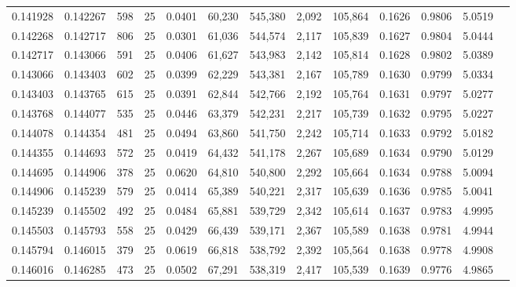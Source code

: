 \begin{tabular}{rrrrrrrrrrrrr}
0.141928 & 0.142267 &   598 &  25 &                                     0.0401 &  60,230 & 545,380 &   2,092 & 105,864 & 0.1626 & 0.9806 & 5.0519 \\
0.142268 & 0.142717 &   806 &  25 &                                     0.0301 &  61,036 & 544,574 &   2,117 & 105,839 & 0.1627 & 0.9804 & 5.0444 \\
0.142717 & 0.143066 &   591 &  25 &                                     0.0406 &  61,627 & 543,983 &   2,142 & 105,814 & 0.1628 & 0.9802 & 5.0389 \\
0.143066 & 0.143403 &   602 &  25 &                                     0.0399 &  62,229 & 543,381 &   2,167 & 105,789 & 0.1630 & 0.9799 & 5.0334 \\
0.143403 & 0.143765 &   615 &  25 &                                     0.0391 &  62,844 & 542,766 &   2,192 & 105,764 & 0.1631 & 0.9797 & 5.0277 \\
0.143768 & 0.144077 &   535 &  25 &                                     0.0446 &  63,379 & 542,231 &   2,217 & 105,739 & 0.1632 & 0.9795 & 5.0227 \\
0.144078 & 0.144354 &   481 &  25 &                                     0.0494 &  63,860 & 541,750 &   2,242 & 105,714 & 0.1633 & 0.9792 & 5.0182 \\
0.144355 & 0.144693 &   572 &  25 &                                     0.0419 &  64,432 & 541,178 &   2,267 & 105,689 & 0.1634 & 0.9790 & 5.0129 \\
0.144695 & 0.144906 &   378 &  25 &                                     0.0620 &  64,810 & 540,800 &   2,292 & 105,664 & 0.1634 & 0.9788 & 5.0094 \\
0.144906 & 0.145239 &   579 &  25 &                                     0.0414 &  65,389 & 540,221 &   2,317 & 105,639 & 0.1636 & 0.9785 & 5.0041 \\
0.145239 & 0.145502 &   492 &  25 &                                     0.0484 &  65,881 & 539,729 &   2,342 & 105,614 & 0.1637 & 0.9783 & 4.9995 \\
0.145503 & 0.145793 &   558 &  25 &                                     0.0429 &  66,439 & 539,171 &   2,367 & 105,589 & 0.1638 & 0.9781 & 4.9944 \\
0.145794 & 0.146015 &   379 &  25 &                                     0.0619 &  66,818 & 538,792 &   2,392 & 105,564 & 0.1638 & 0.9778 & 4.9908 \\
0.146016 & 0.146285 &   473 &  25 &                                     0.0502 &  67,291 & 538,319 &   2,417 & 105,539 & 0.1639 & 0.9776 & 4.9865 \\

\end{tabular}
